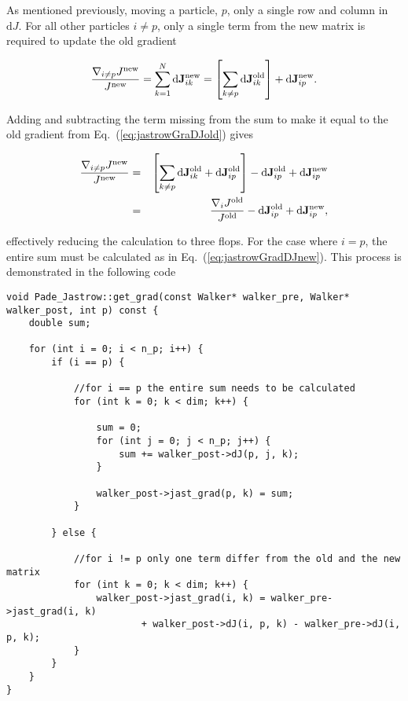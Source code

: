 As mentioned previously, moving a particle, $p$, only a single row and column in $\mathrm{d} J$. For all other particles $i\ne p$, only a single term from the new matrix is required to update the old gradient

\begin{equation}
 \frac{\nabla_{i\ne p} J^\mathrm{new}}{J^\mathrm{new}} = \sum_{k = 1}^N \mathrm{d}\mathbf{J}^\mathrm{new}_{ik} = \left[\sum_{k \ne p} \mathrm{d}\mathbf{J}^\mathrm{old}_{ik}\right] + \mathrm{d}\mathbf{J}^\mathrm{new}_{ip}.
\end{equation}

Adding and subtracting the term missing from the sum to make it equal to the old gradient from Eq.~(\ref{eq:jastrowGraDJold}) gives

\begin{eqnarray}
 \frac{\nabla_{i\ne p} J^\mathrm{new}}{J^\mathrm{new}} &=& \left[\sum_{k \ne p} \mathrm{d}\mathbf{J}^\mathrm{old}_{ik} + \mathrm{d}\mathbf{J}^\mathrm{old}_{ip}\right] - \mathrm{d}\mathbf{J}^\mathrm{old}_{ip} + \mathrm{d}\mathbf{J}^\mathrm{new}_{ip} \\
 &=& \frac{\nabla_i J^\mathrm{old}}{J^\mathrm{old}} - \mathrm{d}\mathbf{J}^\mathrm{old}_{ip} + \mathrm{d}\mathbf{J}^\mathrm{new}_{ip}, \label{eq:jastrowGradOptDJ}
\end{eqnarray}

effectively reducing the calculation to three flops. For the case where $i=p$, the entire sum must be calculated as in Eq.~(\ref{eq:jastrowGradDJnew}). This process is demonstrated in the following code

\vspace{0.25cm}
\begin{lstlisting}[caption={The implementation of the Padé Jastrow gradient using the matrix from Eq.~(\ref{eq:jastrowDJ}). Lines 18-25 describe the case for gradients not equal to the moved particle, i.e. Eq.~(\ref{eq:jastrowGradOptDJ}). Lines 5-18 describe the case for the gradient of the moved particle, where the full sum is calculated as Eq.~(\ref{eq:jastrowGradDJnew}).}]
void Pade_Jastrow::get_grad(const Walker* walker_pre, Walker* walker_post, int p) const {
    double sum;

    for (int i = 0; i < n_p; i++) {
        if (i == p) {
       
            //for i == p the entire sum needs to be calculated
            for (int k = 0; k < dim; k++) {

                sum = 0;
                for (int j = 0; j < n_p; j++) {
                    sum += walker_post->dJ(p, j, k);
                }

                walker_post->jast_grad(p, k) = sum;
            }
        
        } else {
       
            //for i != p only one term differ from the old and the new matrix
            for (int k = 0; k < dim; k++) {
                walker_post->jast_grad(i, k) = walker_pre->jast_grad(i, k)
                        + walker_post->dJ(i, p, k) - walker_pre->dJ(i, p, k);
            }
        }
    }
}
\end{lstlisting}

